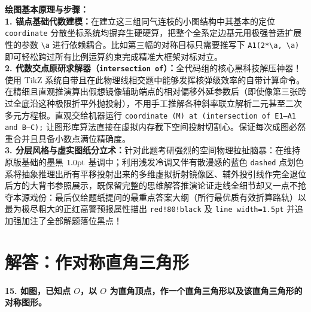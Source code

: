 {\small\color{blue!70!black}
\textbf{绘图基本原理与步骤：}\\
\textbf{1. 锚点基础代数建模：}在建立这三组同气连枝的小图结构中其基本的定位 \texttt{coordinate} 分散坐标系统均摒弃生硬硬算，把整个全系定边基元用极强普适扩展性的参数 \texttt{\textbackslash a} 进行依赖耦合。比如第三幅的对称目标只需要推写下 \texttt{A1(2*\textbackslash a, \textbackslash a)} 即可轻松跨过所有比例运算约束完成精准大框架对标对立。\\
\textbf{2. 代数交点原研求解器（\texttt{intersection of}）：}全代码组的核心黑科技解压神器！使用 TikZ 系统自带且在此物理线相交题中能够发挥核弹级效率的自带计算命令。在精细且直观推演算出假想镜像辅助端点的相对偏移外延参数后（即使像第三张跨过全底沿这种极限折平外抛投射），不用手工推解各种斜率联立解析二元甚至二次多元方程根。直观交给机器运行 \texttt{coordinate (M) at (intersection of E1--A1 and B--C);} 让图形库算法直接在虚拟内存截下空间投射切割心。保证每次成图必然重合并且具备小数点满位精确度。\\
\textbf{3. 分层风格与虚实图纸分立术：}针对此题考研强烈的空间物理拉扯脑暴：在维持原版基础的墨黑 $1.0\rm{pt}$ 基调中；利用浅发冷调又伴有散漫感的蓝色 \texttt{dashed} 点划色系将抽象推理出所有平移投射出来的多维虚拟折射镜像区、辅外投引线作完全退位后方的大背书参照展示，既保留完整的思维解答推演论证走线全细节却又一点不抢夺本源戏份：最后仅给题纸提问的最重点答案大纲（所行最优质有效折算路轨）以最为极尽粗大的正红高警预报属性描出 \texttt{red!80!black} 及 \texttt{line width=1.5pt} 并追加强加注了全部解题落位黑点！
}

\newpage



\section{解答：作对称直角三角形}

\vspace{0.6cm}

\textbf{15. 如图，已知点 $O$，以 $O$ 为直角顶点，作一个直角三角形以及该直角三角形的对称图形。}

\vspace{0.4cm}

